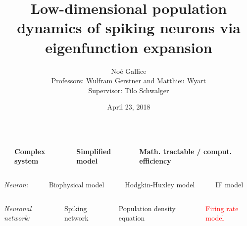 \documentclass{beamer}
\title[Short title]{Low-dimensional population dynamics of spiking neurons via eigenfunction expansion}
\author{No\'e Gallice \\ \medskip Professors:  Wulfram Gerstner and Matthieu Wyart\\ \medskip Supervisor:  Tilo Schwalger} %
\institute[EPFL] %
{ Laboratory of Computational Neuroscience, EPFL \\ %
\medskip %
}
\date{April 23, 2018}
\begin{document}
\begin{frame}
	\titlepage %
\end{frame}


\begin{frame}

\small{
	\begin{columns}
	\begin{column}{.12\textwidth}

		
	\end{column}
	\begin{column}{.28\textwidth}
			\centering
		\textbf{Complex system } 
		
	\end{column}
	\begin{column}{.3\textwidth}
			\centering
\textbf{Simplified model} 
	
\end{column}
	\begin{column}{.3\textwidth}
			\centering
		\textbf{Math. tractable / comput. efficiency}
	\end{column}
\end{columns}

\vspace{0.5cm}

\begin{columns}
	\begin{column}{.15\textwidth}
		\textit{Neuron:}
		
	\end{column}
	\begin{column}{.25\textwidth}
	\centering
	Biophysical model 	
	\end{column}
	\begin{column}{.3\textwidth}
	\centering
	Hodgkin-Huxley model 
	\end{column}
	\begin{column}{.3\textwidth}
	\centering
	IF model
	\end{column}
\end{columns}

\pause
\vspace{0.5cm}
\begin{columns}
	\begin{column}{.15\textwidth}
		\textit{Neuronal network:} 
		
	\end{column}
	\begin{column}{.25\textwidth}
		\centering
	Spiking network
	\end{column}
	\begin{column}{.3\textwidth}
		\centering
	  Population density equation
	\end{column}
	\begin{column}{.3\textwidth}
		\centering
		\textcolor{red}{Firing rate model}
	\end{column}
\end{columns}
}


\end{frame}
\end{document}
